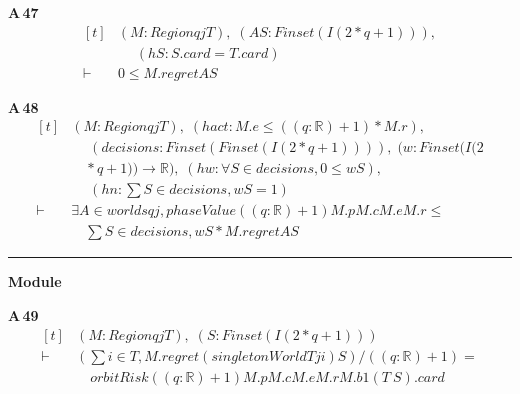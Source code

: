 \noindent\textbf{A\,47}\quad{}
{\footnotesize\[ \begin{aligned}[t]
&(\mathit{M} : \mathit{Region} \mathit{q} \mathit{j} \mathit{T}),\; (\mathit{A} \mathit{S} : \mathit{Finset} (\mathit{I} (2*\mathit{q}+1))),\\
&\quad \; (\mathit{hS} : \mathit{S}.\mathit{card}=\mathit{T}.\mathit{card})\\
\vdash\;&0 \leq \mathit{M}.\mathit{regret} \mathit{A} \mathit{S}
\end{aligned} \]}

\noindent\textbf{A\,48}\quad{}
{\footnotesize\[ \begin{aligned}[t]
&(\mathit{M} : \mathit{Region} \mathit{q} \mathit{j} \mathit{T}),\; (\mathit{hact} : \mathit{M}.\mathit{e} \leq ((\mathit{q}:\mathbb{R} )+1)*\mathit{M}.\mathit{r}),\\
&\quad \; (\mathit{decisions} : \mathit{Finset} (\mathit{Finset} (\mathit{I} (2*\mathit{q}+1)))),\; (\mathit{w} : \mathit{Finset} (\mathit{I} (2\\
&\quad *\mathit{q}+1)) \to \mathbb{R} ),\; (\mathit{hw} : \forall \mathit{S} \in \mathit{decisions},0 \leq \mathit{w} \mathit{S}),\\
&\quad \; (\mathit{hn} : \textstyle\sum \mathit{S} \in \mathit{decisions},\mathit{w} \mathit{S}=1)\\
\vdash\;&\exists \mathit{A} \in \mathit{worlds} \mathit{q} \mathit{j},\mathit{phaseValue} ((\mathit{q}:\mathbb{R} )+1) \mathit{M}.\mathit{p} \mathit{M}.\mathit{c} \mathit{M}.\mathit{e} \mathit{M}.\mathit{r} \leq\\
&\quad \textstyle\sum \mathit{S} \in \mathit{decisions},\mathit{w} \mathit{S}*\mathit{M}.\mathit{regret} \mathit{A} \mathit{S}
\end{aligned} \]}

\vspace{4pt}\noindent\rule{\columnwidth}{0.4pt}\par\vspace{2pt}
\noindent\textbf{Module }\par\vspace{3pt}

\noindent\textbf{A\,49}\quad{}
{\footnotesize\[ \begin{aligned}[t]
&(\mathit{M} : \mathit{Region} \mathit{q} \mathit{j} \mathit{T}),\; (\mathit{S} : \mathit{Finset} (\mathit{I} (2*\mathit{q}+1)))\\
\vdash\;&(\textstyle\sum \mathit{i} \in \mathit{T},\mathit{M}.\mathit{regret} (\mathit{singletonWorld} \mathit{T} \mathit{j} \mathit{i}) \mathit{S})/((\mathit{q}:\mathbb{R} )+1) =\\
&\quad \mathit{orbitRisk} ((\mathit{q}:\mathbb{R} )+1) \mathit{M}.\mathit{p} \mathit{M}.\mathit{c} \mathit{M}.\mathit{e} \mathit{M}.\mathit{r} \mathit{M}.\mathit{b} 1 (\mathit{T} \ \mathit{S}).\mathit{card}
\end{aligned} \]}

